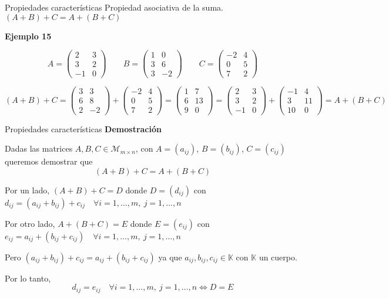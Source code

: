 \documentclass[
  ignorenonframetext,
]{beamer}
\begin{document}
\begin{frame}{Propiedades características}
\protect\hypertarget{propiedades-caracteruxedsticas-2}{}
Propiedad asociativa de la suma. \((A+B)+C=A+(B+C)\)

\textbf{Ejemplo 15}

\[A = \begin{pmatrix}2&3\\3&2\\-1&0\end{pmatrix}\qquad B=\begin{pmatrix}1&0\\3&6\\3&-2\end{pmatrix}\qquad C = \begin{pmatrix}-2&4\\0&5\\7&2\end{pmatrix}\]

\[(A+B)+C = \begin{pmatrix}3&3\\6&8\\2&-2\end{pmatrix}+ \begin{pmatrix}-2&4\\0&5\\7&2\end{pmatrix}= \begin{pmatrix}1&7\\6&13\\9&0\end{pmatrix}=\begin{pmatrix}2&3\\3&2\\-1&0\end{pmatrix}+\begin{pmatrix}-1&4\\3&11\\10&0\end{pmatrix} = A+(B+C)\]
\end{frame}

\begin{frame}{Propiedades características}
\protect\hypertarget{propiedades-caracteruxedsticas-3}{}
\textbf{Demostración}

Dadas las matrices \(A,B,C\in\mathcal{M}_{m\times n}\), con
\(A = (a_{ij})\), \(B=(b_{ij})\), \(C = (c_{ij})\) queremos demostrar
que \[(A+B) + C = A+(B+C)\]

Por un lado, \((A+B) + C = D\) donde \(D = (d_{ij})\) con
\(d_{ij} =( a_{ij}+b_{ij}) +c_{ij}\quad\forall i=1,\dots,m,\ j=1,\dots,n\)

Por otro lado, \(A+(B+C) = E\) donde \(E = (e_{ij})\) con
\(e_{ij} = a_{ij}+(b_{ij}+c_{ij})\quad\forall i=1,\dots,m,\ j=1,\dots,n\)

Pero \((a_{ij}+b_{ij})+c_{ij} = a_{ij}+(b_{ij}+c_{ij})\) ya que
\(a_{ij},b_{ij},c_{ij}\in\mathbb{K}\) con \(\mathbb{K}\) un cuerpo.

Por lo tanto,
\[d_{ij} = e_{ij}\quad\forall i=1,\dots,m,\ j=1,\dots,n\Leftrightarrow D= E \]
\end{frame}
\end{document}
